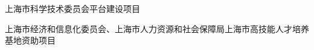 
\begin{projects}{99}
    \item 上海市科学技术委员会平台建设项目%
    \item 上海市经济和信息化委员会、上海市人力资源和社会保障局上海市高技能人才培养基地资助项目%
\end{projects}

